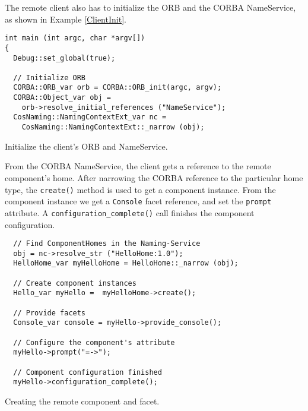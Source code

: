 \noindent
The remote client also has to initialize the ORB and the CORBA NameService,
as shown in Example \ref{ClientInit}.
\begin{Example}
\begin{minifbox}
\begin{small}
\begin{verbatim}
int main (int argc, char *argv[])
{
  Debug::set_global(true); 

  // Initialize ORB 
  CORBA::ORB_var orb = CORBA::ORB_init(argc, argv);
  CORBA::Object_var obj = 
    orb->resolve_initial_references ("NameService");
  CosNaming::NamingContextExt_var nc = 
    CosNaming::NamingContextExt::_narrow (obj);
\end{verbatim}
\end{small}
\end{minifbox}
\caption{Initialize the client's ORB and NameService.}
\label{ClientInit}
\end{Example}

From the CORBA NameService, the client gets a reference to the 
remote component's home. 
After narrowing the CORBA reference to the particular home type, 
the {\tt create()} method is used to get a component instance.
From the component instance we get a {\tt Console} facet reference, 
and set the {\tt prompt} attribute. 
A {\tt configuration\_complete()} call finishes the component 
configuration.

\begin{Example}
\begin{minifbox}
\begin{small}
\begin{verbatim}
  // Find ComponentHomes in the Naming-Service
  obj = nc->resolve_str ("HelloHome:1.0");
  HelloHome_var myHelloHome = HelloHome::_narrow (obj);

  // Create component instances
  Hello_var myHello =  myHelloHome->create();

  // Provide facets   
  Console_var console = myHello->provide_console();
	
  // Configure the component's attribute
  myHello->prompt("=->");

  // Component configuration finished	
  myHello->configuration_complete();
\end{verbatim}
\end{small}
\end{minifbox}
\caption{Creating the remote component and facet.}
\label{CreatingRemoteComponent}
\end{Example}

